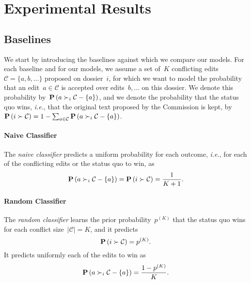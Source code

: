 \section{Experimental Results}
\label{lmp:sec:results}

\subsection{Baselines}

We start by introducing the baselines against which we compare our models.
For each baseline and for our models, we assume a set of~$K$ conflicting edits \mbox{$\mathcal{C} = \{ a, b, \ldots \}$} proposed on dossier~$i$, for which we want to model the probability that an edit~$a \in \mathcal{C}$ is accepted over edits~$b, \ldots$ on this dossier.
We denote this probability by~$\mathbf{P}\left(  a \succ_i \mathcal{C} - \{ a\}  \right)$, and we denote the probability that the status quo wins, \textit{i.e.}, that the original text proposed by the Commission is kept, by~$\mathbf{P}\left(  i \succ \mathcal{C}  \right) = 1 - \sum_{a\in \mathcal{C}} \mathbf{P}\left(  a \succ_i \mathcal{C} - \{a\}  \right)$.

\paragraph{Naive Classifier}

The \textit{naive classifier} predicts a uniform probability for each outcome, \textit{i.e.}, for each of the conflicting edits or the status quo to win, as
\begin{equation*}
	\mathbf{P}\left(  a \succ_i \mathcal{C} - \{ a\}  \right) = \mathbf{P}\left(  i \succ \mathcal{C}  \right) = \frac{1}{K + 1}.
\end{equation*}

\paragraph{Random Classifier}

The \textit{random classifier} learns the prior probability~$p^{(K)}$ that the status quo wins for each conflict size~$\vert \mathcal{C} \vert = K$, and it predicts
\begin{equation*}
	\mathbf{P}\left(  i \succ \mathcal{C}  \right) = p^{(K)}.
\end{equation*}
It predicts uniformly each of the edits to win as
\begin{equation*}
	\mathbf{P}\left(  a \succ_i \mathcal{C} - \{ a\}  \right) = \frac{1-p^{(K)}}{K}.
\end{equation*}

